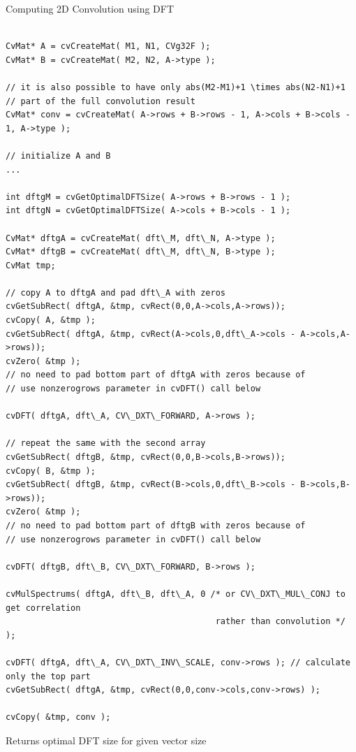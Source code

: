Computing 2D Convolution using DFT

\begin{lstlisting}

CvMat* A = cvCreateMat( M1, N1, CVg32F );
CvMat* B = cvCreateMat( M2, N2, A->type );

// it is also possible to have only abs(M2-M1)+1 \times abs(N2-N1)+1
// part of the full convolution result
CvMat* conv = cvCreateMat( A->rows + B->rows - 1, A->cols + B->cols - 1, A->type );

// initialize A and B
...

int dftgM = cvGetOptimalDFTSize( A->rows + B->rows - 1 );
int dftgN = cvGetOptimalDFTSize( A->cols + B->cols - 1 );

CvMat* dftgA = cvCreateMat( dft\_M, dft\_N, A->type );
CvMat* dftgB = cvCreateMat( dft\_M, dft\_N, B->type );
CvMat tmp;

// copy A to dftgA and pad dft\_A with zeros
cvGetSubRect( dftgA, &tmp, cvRect(0,0,A->cols,A->rows));
cvCopy( A, &tmp );
cvGetSubRect( dftgA, &tmp, cvRect(A->cols,0,dft\_A->cols - A->cols,A->rows));
cvZero( &tmp );
// no need to pad bottom part of dftgA with zeros because of
// use nonzerogrows parameter in cvDFT() call below

cvDFT( dftgA, dft\_A, CV\_DXT\_FORWARD, A->rows );

// repeat the same with the second array
cvGetSubRect( dftgB, &tmp, cvRect(0,0,B->cols,B->rows));
cvCopy( B, &tmp );
cvGetSubRect( dftgB, &tmp, cvRect(B->cols,0,dft\_B->cols - B->cols,B->rows));
cvZero( &tmp );
// no need to pad bottom part of dftgB with zeros because of
// use nonzerogrows parameter in cvDFT() call below

cvDFT( dftgB, dft\_B, CV\_DXT\_FORWARD, B->rows );

cvMulSpectrums( dftgA, dft\_B, dft\_A, 0 /* or CV\_DXT\_MUL\_CONJ to get correlation
                                          rather than convolution */ );

cvDFT( dftgA, dft\_A, CV\_DXT\_INV\_SCALE, conv->rows ); // calculate only the top part
cvGetSubRect( dftgA, &tmp, cvRect(0,0,conv->cols,conv->rows) );

cvCopy( &tmp, conv );

\end{lstlisting}

\label{GetOptimalDFTSize}

Returns optimal DFT size for given vector size


